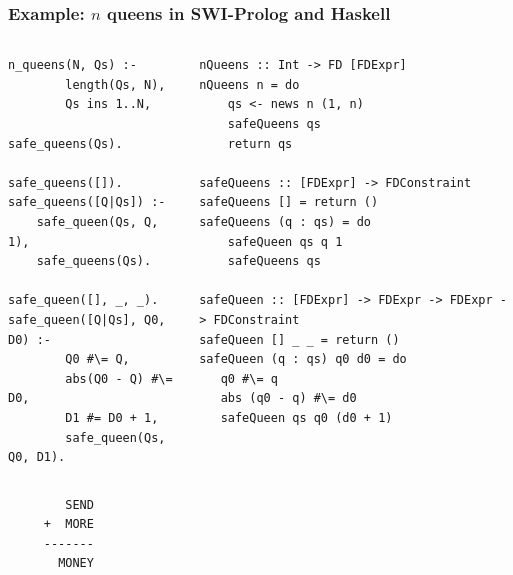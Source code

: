 \documentclass[aspectratio=169,hyphens]{beamer} %
\begin{document}
\begin{frame}[fragile]
    \frametitle{Example: $n$ queens in SWI-Prolog and Haskell}

\begin{columns}[t]
\column[t]{0.33\paperwidth}
\begin{verbatim}
n_queens(N, Qs) :-
        length(Qs, N),
        Qs ins 1..N,
        safe_queens(Qs).

safe_queens([]).
safe_queens([Q|Qs]) :-
    safe_queen(Qs, Q, 1),
    safe_queens(Qs).

safe_queen([], _, _).
safe_queen([Q|Qs], Q0, D0) :-
        Q0 #\= Q,
        abs(Q0 - Q) #\= D0,
        D1 #= D0 + 1,
        safe_queen(Qs, Q0, D1).
\end{verbatim}
\pause
\column[t]{0.59\paperwidth}
\begin{verbatim}
nQueens :: Int -> FD [FDExpr]
nQueens n = do
    qs <- news n (1, n)
    safeQueens qs
    return qs

safeQueens :: [FDExpr] -> FDConstraint
safeQueens [] = return ()
safeQueens (q : qs) = do
    safeQueen qs q 1
    safeQueens qs

safeQueen :: [FDExpr] -> FDExpr -> FDExpr -> FDConstraint
safeQueen [] _ _ = return ()
safeQueen (q : qs) q0 d0 = do
   q0 #\= q 
   abs (q0 - q) #\= d0
   safeQueen qs q0 (d0 + 1)
\end{verbatim}
\end{columns}
\end{frame}
\begin{frame}[fragile]
    \begin{verbatim}
        SEND
     +  MORE
     -------
       MONEY
    \end{verbatim}

\end{frame}
\end{document}
